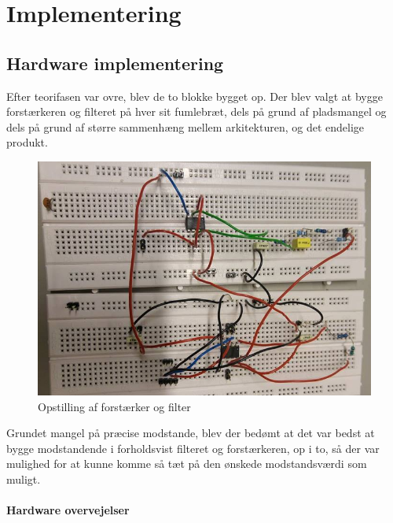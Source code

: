 \chapter{Implementering}

\section{Hardware implementering}\label{Hardware implementering}

Efter teorifasen var ovre, blev de to blokke bygget op. Der blev valgt at bygge forstærkeren og filteret på hver sit fumlebræt, dels på grund af pladsmangel og dels på grund af større sammenhæng mellem arkitekturen, og det endelige produkt.\\

\begin{figure}[H]
	\centering
	\includegraphics[width=1\textwidth]{Figurer/Hardware/samletopstilling}
	\caption{Opstilling af forstærker og filter}
	\label{Dsamletopbygning}
\end{figure}

Grundet mangel på præcise modstande, blev der bedømt at det var bedst at bygge modstandende i forholdsvist filteret og forstærkeren, op i to, så der var mulighed for at kunne komme så tæt på den ønskede modstandsværdi som muligt. \\

\subsubsection{Hardware overvejelser}

